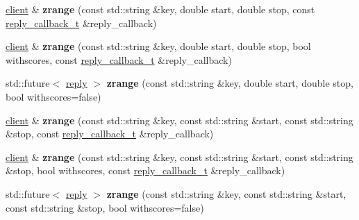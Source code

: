 \begin{DoxyCompactItemize}
\hyperlink{classcpp__redis_1_1client}{client} \& {\bfseries zrange} (const std\+::string \&key, double start, double stop, const \hyperlink{classcpp__redis_1_1client_a061a1140d36d2eaeda82b09a0bb3f9f2}{reply\+\_\+callback\+\_\+t} \&reply\+\_\+callback)
\item 
\mbox{\label{classcpp__redis_1_1client_ab37fd922b733c5fa64f7a0dc4be22efe}} 
\hyperlink{classcpp__redis_1_1client}{client} \& {\bfseries zrange} (const std\+::string \&key, double start, double stop, bool withscores, const \hyperlink{classcpp__redis_1_1client_a061a1140d36d2eaeda82b09a0bb3f9f2}{reply\+\_\+callback\+\_\+t} \&reply\+\_\+callback)
\item 
\mbox{\label{classcpp__redis_1_1client_a0286a2953aeaec8c23d0e292fe2fccc2}} 
std\+::future$<$ \hyperlink{classcpp__redis_1_1reply}{reply} $>$ {\bfseries zrange} (const std\+::string \&key, double start, double stop, bool withscores=false)
\item 
\mbox{\label{classcpp__redis_1_1client_ad24c21a0344652d821d0628c68057ecb}} 
\hyperlink{classcpp__redis_1_1client}{client} \& {\bfseries zrange} (const std\+::string \&key, const std\+::string \&start, const std\+::string \&stop, const \hyperlink{classcpp__redis_1_1client_a061a1140d36d2eaeda82b09a0bb3f9f2}{reply\+\_\+callback\+\_\+t} \&reply\+\_\+callback)
\item 
\mbox{\label{classcpp__redis_1_1client_a3768026508c4c2e28c600bf7be54b4a1}} 
\hyperlink{classcpp__redis_1_1client}{client} \& {\bfseries zrange} (const std\+::string \&key, const std\+::string \&start, const std\+::string \&stop, bool withscores, const \hyperlink{classcpp__redis_1_1client_a061a1140d36d2eaeda82b09a0bb3f9f2}{reply\+\_\+callback\+\_\+t} \&reply\+\_\+callback)
\item 
\mbox{\label{classcpp__redis_1_1client_aaaaf7f2d11f02bc7709be1b2a654894d}} 
std\+::future$<$ \hyperlink{classcpp__redis_1_1reply}{reply} $>$ {\bfseries zrange} (const std\+::string \&key, const std\+::string \&start, const std\+::string \&stop, bool withscores=false)
\item 
\mbox{\label{classcpp__redis_1_1client_a5921728661050f43652a60333a79aaae}} 

\end{DoxyCompactItemize}
